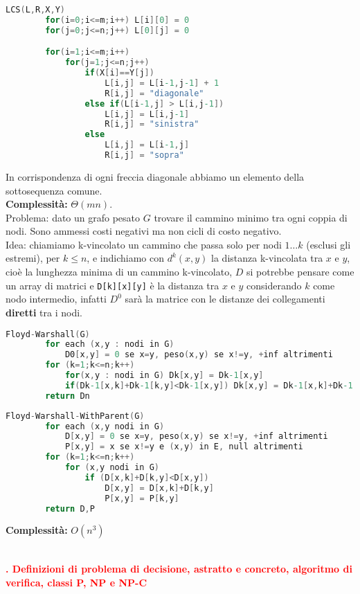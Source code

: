 \documentclass[12pt]{article}
\newcounter{questioncounter}
\newcommand{\question}[1]{
    \stepcounter{questioncounter}
    \textbf{\\\textcolor{red}{\arabic{questioncounter}. #1}}\\
}
\begin{document}
\begin{lstlisting}[language=C]
    LCS(L,R,X,Y)
        for(i=0;i<=m;i++) L[i][0] = 0
        for(j=0;j<=n;j++) L[0][j] = 0

        for(i=1;i<=m;i++)
            for(j=1;j<=n;j++)
                if(X[i]==Y[j])
                    L[i,j] = L[i-1,j-1] + 1
                    R[i,j] = "diagonale"
                else if(L[i-1,j] > L[i,j-1])
                    L[i,j] = L[i,j-1]
                    R[i,j] = "sinistra"
                else
                    L[i,j] = L[i-1,j]
                    R[i,j] = "sopra"
\end{lstlisting}
In corrispondenza di ogni freccia diagonale abbiamo un elemento della sottosequenza comune.\\
\textbf{Complessità:} $\Theta(mn)$.\\
Problema: dato un grafo pesato $G$ trovare il cammino minimo tra ogni coppia di nodi. Sono ammessi costi negativi ma non cicli di costo negativo.\\
Idea: chiamiamo k-vincolato un cammino che passa solo per nodi $1\ldots k$ (esclusi gli estremi), per $k\leq n$, e indichiamo con $d^{k}(x,y)$ la distanza k-vincolata tra $x$ e $y$, cioè la lunghezza minima di un cammino k-vincolato, $D$ si potrebbe pensare come un array di matrici e \texttt{D[k][x][y]} è la distanza tra $x$ e $y$ considerando $k$ come nodo intermedio, infatti $D^{0}$ sarà la matrice con le distanze dei collegamenti \textbf{diretti} tra i nodi. 
\begin{lstlisting}[language=C]
    Floyd-Warshall(G)
        for each (x,y : nodi in G)
            D0[x,y] = 0 se x=y, peso(x,y) se x!=y, +inf altrimenti
        for (k=1;k<=n;k++)
            for(x,y : nodi in G) Dk[x,y] = Dk-1[x,y]
            if(Dk-1[x,k]+Dk-1[k,y]<Dk-1[x,y]) Dk[x,y] = Dk-1[x,k]+Dk-1[k,y]
        return Dn
\end{lstlisting}
\begin{lstlisting}[language=C]
    Floyd-Warshall-WithParent(G)
        for each (x,y nodi in G)
            D[x,y] = 0 se x=y, peso(x,y) se x!=y, +inf altrimenti
            P[x,y] = x se x!=y e (x,y) in E, null altrimenti
        for (k=1;k<=n;k++)
            for (x,y nodi in G)
                if (D[x,k]+D[k,y]<D[x,y])
                    D[x,y] = D[x,k]+D[k,y]
                    P[x,y] = P[k,y]
        return D,P
\end{lstlisting}
\textbf{Complessità:} $O(n^{3})$
\question{Definizioni di problema di decisione, astratto e concreto, algoritmo di verifica, classi P, NP e NP-C}
\end{document}
